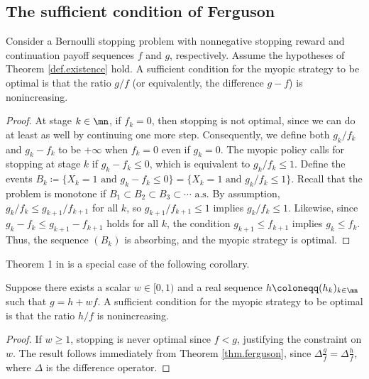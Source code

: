 \documentclass[11pt]{article}
\begin{document}
\subsection{The sufficient condition of Ferguson}


\begin{thm}\label{thm.ferguson}
	Consider a Bernoulli stopping problem with nonnegative stopping reward and  continuation payoff sequences $f$ and $g$, respectively. Assume the hypotheses of Theorem \ref{def.existence} hold. 	A sufficient  condition for the myopic strategy to be optimal is that the ratio $g/f$ (or equivalently, the  difference $g-f$) is nonincreasing.
\end{thm}	
\begin{proof}
	At stage $k \in \mn$, if $f_k = 0$, then stopping is not optimal, since we can do at least as well by continuing one more step. Consequently, we define both $g_k/f_k$	and $g_k-f_k$ to be $+\infty$ when $f_k=0$ even if $g_k=0$. The myopic policy calls for stopping at stage $k$ if  $g_k - f_k \le 0$, which is equivalent to  $g_k / f_k \le 1$. Define the events $B_k \coloneqq \{ X_k =1 \text { and } g_k - f_k\le 0 \}= \{ X_k =1  \text { and } g_k/ f_k \le 1 \}.$  Recall that the problem is  monotone \cite{CRS} if $B_1 \subset B_2 \subset B_3 \subset \cdots \text{ a.s.}$
	By assumption, $g_k / f_k \le g_{k+1} / f_{k+1}$ for all $k$, so $g_{k+1} / f_{k+1} \le 1$ implies  $g_{k} / f_{k} \le 1$. Likewise,  since $g_k - f_k \le g_{k+1} - f_{k+1}$ holds for all $k$, the condition $g_{k+1} \le f_{k+1} $ implies $g_{k} \le f_{k}$. 
	Thus, the sequence  $(B_k)$ is absorbing, and the myopic strategy is optimal.
%	
\end{proof}
Theorem 1 in \cite{FergusonOdds} is a special case of the following corollary.
\begin{cor}\label{cor.ferguson}
	Suppose there exists a scalar $w \in [0,1)$ and a real sequence  $h\coloneqq(h_k)_{k \in \mn}$ such that $g = h + w f $. A sufficient  condition for the myopic strategy to be optimal is that the ratio $h/f$  is nonincreasing.
\end{cor}	
\begin{proof}
	If 	$w \ge 1$, stopping is never optimal since $f < g$, justifying the constraint on $w$. The result follows immediately from Theorem \ref{thm.ferguson}, since  $\Delta \displaystyle\frac{g}{ f}=\Delta \displaystyle\frac{h}{ f} $, where $\Delta$  is the difference operator.
\end{proof}
\end{document}
